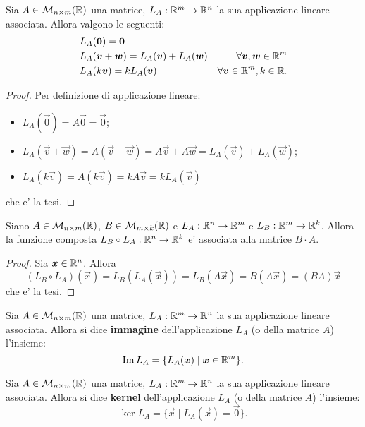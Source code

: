\begin{proposition}[Linearita']
    Sia $A \in \mathcal{M}_{n \times m}(\mathbb{R})$ una matrice, $L_A : \mathbb{R}^m \to \mathbb{R}^n$ la sua applicazione lineare associata. Allora valgono le seguenti:
    \begin{align}
        &L_A(\bm{0}) = \bm{0} \\
        &L_A(\bm{v} + \bm{w}) = L_A(\bm{v}) + L_A(\bm{w}) &\forall \bm{v}, \bm{w} \in \mathbb{R}^m \\
        &L_A(k\bm{v}) = kL_A(\bm{v}) &\forall \bm{v} \in \mathbb{R}^m, k \in \mathbb{R}. 
    \end{align}
\end{proposition}
\begin{proof}
    Per definizione di applicazione lineare:
    \begin{itemize}
        \item $L_A(\vec 0) = A\vec 0 = \vec 0$;
        \item $L_A(\vec v + \vec w) = A(\vec v + \vec w) = A\vec v + A\vec w = L_A(\vec v) + L_A(\vec w)$;
        \item $L_A(k\vec v) = A(k\vec v) = kA\vec v = kL_A(\vec v)$
    \end{itemize}
    che e' la tesi.
\end{proof}

\begin{proposition}
    Siano $A \in \mathcal{M}_{n \times m}(\mathbb{R})$, $B \in \mathcal{M}_{m \times k}(\mathbb{R})$ e $L_A : \mathbb{R}^n \to \mathbb{R}^m$ e $L_B : \mathbb{R}^m \to \mathbb{R}^k$. Allora la funzione composta $L_B \circ L_A : \mathbb{R}^n \to \mathbb{R}^k$ e' associata alla matrice $B\cdot A$.
\end{proposition}
\begin{proof}
    Sia $\bm{x} \in \mathbb{R}^n$. Allora
    \[
        (L_B \circ L_A)(\vec{x}) = L_B(L_A(\vec{x})) = L_B(A\vec{x}) = B(A\vec{x}) = (BA)\vec{x}
    \]
    che e' la tesi.
\end{proof}

\begin{definition}
    Sia $A \in \mathcal{M}_{n \times m}(\mathbb{R})$ una matrice, $L_A : \mathbb{R}^m \to \mathbb{R}^n$ la sua applicazione lineare associata. Allora si dice \textbf{immagine} dell'applicazione $L_A$ (o della matrice $A$) l'insieme:
    \begin{equation}
        \operatorname{Im}L_A = \{L_A(\bm{x}) \mid \bm{x} \in \mathbb{R}^m\}.
    \end{equation}
\end{definition}

\begin{definition}
    Sia $A \in \mathcal{M}_{n \times m}(\mathbb{R})$ una matrice, $L_A : \mathbb{R}^m \to \mathbb{R}^n$ la sua applicazione lineare associata. Allora si dice \textbf{kernel} dell'applicazione $L_A$ (o della matrice $A$) l'insieme:
    \begin{equation}
        \ker{L_A} = \{\vec x \mid L_A(\vec x) = \vec 0\}.
    \end{equation}
\end{definition}

